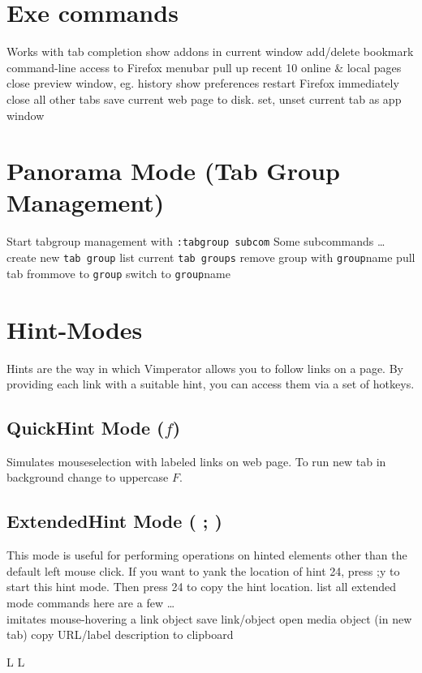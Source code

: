 \section{Exe commands}{Works with tab completion}
	{show addons in current window}
	{add/delete bookmark}
	{command-line access to Firefox menubar}
	{pull up recent 10 online \& local pages}
	{close preview window, eg. history}
	{show preferences}
	{restart Firefox immediately}
	{close all other tabs}
	{save current web page to disk.}
	{set, unset current tab as app window}

\section{Panorama Mode (Tab Group Management)}{Start tabgroup management with {\tt :tabgroup subcom}}
Some subcommands \ldots \\
	{create new {\tt tab group}}
	{list current {\tt tab groups}}
	{remove group with {\tt group}name}
	{pull tab from\or move to {\tt group}}
	{switch to {\tt group}name}




\section{Hint-Modes}{Hints are the way in which Vimperator allows you to follow links on a page. By
providing each link with a suitable hint, you can access them via a set of hotkeys. }
\subsection{QuickHint Mode ($f$)}{Simulates mouseselection with labeled
links on web page. To run new tab in background change to uppercase $F$.}
\subsection{ExtendedHint Mode ( ; )}{This mode is useful for
performing operations on hinted elements other than the default
left mouse click. If you want to yank the location of hint 24, press ;y to start this hint
mode. Then press 24 to copy the hint location.}
	{list all extended mode commands}
here are a few \ldots\\
\cmdS{;~}	{imitates mouse-hovering a link object}
	{save link/object}
	{open media object (in new tab)}
	{copy URL/label description to clipboard}

\copyrightnotice
%


\vfil
\supereject
\if L\lr \else\null\vfill\eject\fi
\if L\lr \else\null\vfill\eject\fi
\bye

